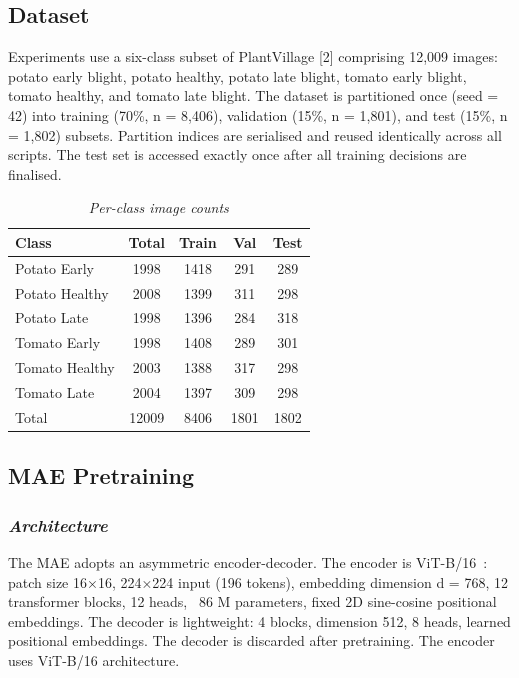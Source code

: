 \documentclass[conference]{IEEEtran}
\begin{document}
\subsection{Dataset}

Experiments use a six-class subset of PlantVillage [2] comprising 12,009 images: potato early blight, potato healthy, potato late blight, tomato early blight, tomato healthy, and tomato late blight. The dataset is partitioned once (seed = 42) into training (70\%, n = 8,406), validation (15\%, n = 1,801), and test (15\%, n = 1,802) subsets. Partition indices are serialised and reused identically across all scripts. The test set is accessed exactly once after all training decisions are finalised.

\begin{table}[H]
\centering
\caption{\textit{Per-class image counts}}
\begin{tabular}{lcccc}
\toprule
Class & Total & Train & Val & Test\\
\midrule
Potato Early & 1998 & 1418 & 291 & 289\\
Potato Healthy & 2008 & 1399 & 311 & 298\\
Potato Late & 1998 & 1396 & 284 & 318\\
Tomato Early & 1998 & 1408 & 289 & 301\\
Tomato Healthy & 2003 & 1388 & 317 & 298\\
Tomato Late & 2004 & 1397 & 309 & 298\\
\midrule
Total & 12009 & 8406 & 1801 & 1802\\
\bottomrule
\end{tabular}
\end{table}

\subsection{MAE Pretraining}
\subsubsection{\textit{\textbf{Architecture}}}
The MAE adopts an asymmetric encoder-decoder. The encoder is ViT-B/16~\cite{3}: patch size 16×16, 224×224 input (196 tokens), embedding dimension d = 768, 12 transformer blocks, 12 heads, ~86 M parameters, fixed 2D sine-cosine positional embeddings. The decoder is lightweight: 4 blocks, dimension 512, 8 heads, learned positional embeddings. The decoder is discarded after pretraining.
The encoder uses ViT-B/16 architecture.
\vspace{0.5em}
\end{document}
